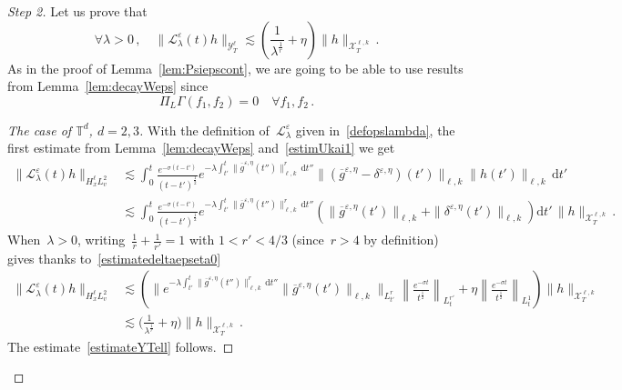 \documentclass[11pt]{article}
\theoremstyle{definition}
\numberwithin{equation}{section}
\numberwithin{figure}{section}
\numberwithin{table}{section}
\newcommand*{\dd}{\mathrm{d}}
\newcommand*{\dt}{\dd t}
\newenvironment{step}[1]{\begin{proof}[#1]}{\let\qed\relax\end{proof}}
\newcommand*\T {\mathbb{T}}
\newcommand*\eps{{\varepsilon}}
\newcommand*\e{{\varepsilon}}
\let\oldforall\forall
\renewcommand*{\forall}{\mathrel{\oldforall}}
\begin{document}
\begin{step}{Step 2}%
Let us prove that
\begin{equation}\label{estimateYTell}
\forall \lambda >0 \,, \quad \big \| \mathcal{L}_\lambda^{\e}(t) h\big\|_{\mathcal{Y}^\ell_T}
\lesssim\left(\frac{1}{\lambda^\frac1r} + \eta \right)\| h \|_{\mathcal{X}_T^{\ell,k}}\,.
\end{equation}
As in the proof of Lemma~\ref{lem:Psiepscont}, we are going to be able to use results from Lemma~\ref{lem:decayWeps} since
\[
\Pi_{L} \Gamma(f_1,f_2) = 0 \quad \forall f_1,f_2 \,.
\]

\begin{step}{The case of $\T^d$, $d = 2,3$}
With the definition of~$ \mathcal{L}_\lambda^{\e}$ given in~\eqref{defopslambda}, the first estimate from Lemma~\ref{lem:decayWeps} and~\eqref{estimUkai1} we get
\begin{align*}
\big \| \mathcal{L}_\lambda^{\e}(t) h\big\|_{H^\ell_xL^2_v} & \lesssim \int_0^t \frac{e^{-\sigma(t-t')}}{(t-t')^\frac12} e^{- \lambda \int_{t'}^t \|\overline g^{\eps,\eta}(t'')\|_{\ell,k}^r\, \dt''}
\|(\overline g^{\eps,\eta}-\delta^{\eps,\eta})(t')\|_{\ell,k}\|h(t')\|_{\ell,k} \, \dt'\\
& \lesssim \int_0^t \frac{e^{-\sigma(t-t')}}{(t-t')^\frac12} e^{- \lambda \int_{t'}^t \|\overline g^{\eps,\eta}(t'')\|_{\ell,k}^r\, \dt''}\!\!\left(\|\overline g^{\eps,\eta}(t')\|_{\ell,k} + \|\delta^{\eps,\eta}(t')\|_{\ell,k}\right)\! \dt' \, \|h\|_{\mathcal{X}_T^{\ell,k}} \,.
\end{align*}
When~$\lambda >0$, writing~$\frac1r+\frac1{r'} = 1$ with $1<r'<4/3$ (since~$r>4$ by definition) gives thanks to~\eqref{estimatedeltaepseta0}
\begin{align*}
\big \| \mathcal{L}_\lambda^{\e}(t) h\big\|_{H^\ell_xL^2_v} &\lesssim\!\left(\big\| e^{- \lambda \int_{t'}^t \|\overline g^{\eps,\eta}(t'')\|_{\ell,k}^r\, \dt'' } \|\overline g^{\eps,\eta}(t')\|_{\ell,k} \big\|_{L^r_{t'}} \left\|\frac{e^{-\sigma t}}{t^\frac12}\right\|_{L^{r'}_{t}} + \eta \left\|\frac{e^{-\sigma t}}{t^\frac12}\right\|_{L^{1}_{t}}\right)
\| h \|_{\mathcal{X}_T^{\ell,k}}\\
& \lesssim \Big(\frac{1}{\lambda^\frac1r}+ \eta\Big) \| h \|_{\mathcal{X}_T^{\ell,k}}\,.
\end{align*}
The estimate~\eqref{estimateYTell} follows.
\end{step}



\end{step}
\end{document}
